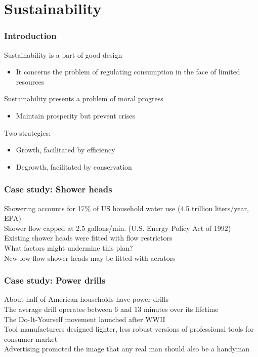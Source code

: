 \documentclass{article}
\begin{document}
\section*{Sustainability}
\label{sec:sustainability}
\subsubsection*{Introduction}
\label{ssub:introduction}
Sustainability is a part of good design
\begin{itemize}
	\item It concerns the problem of regulating consumption in the face of limited resources\\
\end{itemize}
Sustainability presents a problem of moral progress
\begin{itemize}
	\item Maintain prosperity but prevent crises
\end{itemize}
Two strategies:
\begin{itemize}
	\item Growth, facilitated by efficiency
	\item Degrowth, facilitated by conservation
\end{itemize}
\subsubsection*{Case study: Shower heads}
\label{ssub:case_study_shower_heads}
Showering accounts for 17\% of US household water use (4.5 trillion liters/year, EPA)\\
Shower flow capped at 2.5 gallons/min. (U.S. Energy Policy Act of 1992)\\
Existing shower heads were fitted with flow restrictors\\
What factors might undermine this plan?\\
New low-flow shower heads may be fitted with aerators\\
\subsubsection*{Case study: Power drills}
\label{ssub:case_study_power_drills}
About half of American households have power drills\\
The average drill operates between 6 and 13 minutes over its lifetime\\
The Do-It-Yourself movement launched after WWII\\
Tool manufacturers designed lighter, less robust versions of professional tools for consumer market\\
Advertising promoted the image that any real man should also be a handyman\\
\end{document}
